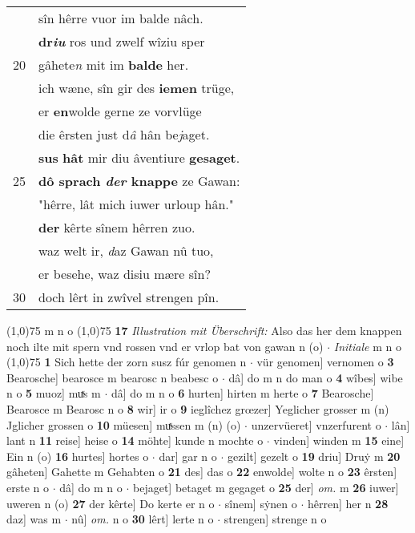 \documentclass[8pt,a4paper,notitlepage]{article}
\begin{document}
\begin{table}[ht]
\begin{minipage}[t]{0.5\linewidth}
\begin{tabular}{rl}
 & sîn hêrre vuor im balde nâch.\\ 
 & \textbf{dr\textit{iu}} ros und zwelf wîziu sper\\ 
20 & gâhete\textit{n} mit im \textbf{balde} her.\\ 
 & ich wæne, sîn gir des \textbf{iemen} trüge,\\ 
 & er \textbf{en}wolde gerne ze vorvlüge\\ 
 & die êrsten just d\textit{â} hân be\textit{j}aget.\\ 
 & \textbf{sus} \textbf{hât} mir diu âventiure \textbf{gesaget}.\\ 
25 & \textbf{dô sprach \textit{der} knappe} ze Gawan:\\ 
 & "hêrre, lât mich iuwer urloup hân."\\ 
 & \textbf{der} kêrte sînem hêrren zuo.\\ 
 & waz welt ir, \textit{d}az Gawan nû tuo,\\ 
 & er besehe, waz disiu mære sîn?\\ 
30 & doch lêrt in zwîvel strengen pîn.\\ 
\end{tabular}
\scriptsize
\line(1,0){75} \newline
m n o \newline
\line(1,0){75} \newline
\textbf{17} \textit{Illustration mit Überschrift:} Also das her dem knappen noch ilte mit spern vnd rossen vnd er vrlop bat von gawan n (o)   $\cdot$ \textit{Initiale} m n o  \newline
\line(1,0){75} \newline
\textbf{1} Sich hette der zorn susz fúr genomen n  $\cdot$ vür genomen] vernomen o \textbf{3} Bearosche] bearosce m bearosc n beabesc o  $\cdot$ dâ] do m n do man o \textbf{4} wîbes] wibe n o \textbf{5} muoz] muͯs m  $\cdot$ dâ] do m n o \textbf{6} hurten] hirten m herte o \textbf{7} Bearosche] Bearosce m Bearosc n o \textbf{8} wir] ir o \textbf{9} ieglîchez grœzer] Yeglicher grosser m (n) Jglicher grossen o \textbf{10} müesen] muͯssen m (n) (o)  $\cdot$ unzervüeret] vnzerfurent o  $\cdot$ lân] lant n \textbf{11} reise] heise o \textbf{14} möhte] kunde n mochte o  $\cdot$ vinden] winden m \textbf{15} eine] Ein n (o) \textbf{16} hurtes] hortes o  $\cdot$ dar] gar n o  $\cdot$ gezilt] gezelt o \textbf{19} driu] Druẏ m \textbf{20} gâheten] Gahette m Gehabten o \textbf{21} des] das o \textbf{22} enwolde] wolte n o \textbf{23} êrsten] erste n o  $\cdot$ dâ] do m n o  $\cdot$ bejaget] betaget m gegaget o \textbf{25} der] \textit{om.} m \textbf{26} iuwer] uweren n (o) \textbf{27} der kêrte] Do kerte er n o  $\cdot$ sînem] sẏnen o  $\cdot$ hêrren] her n \textbf{28} daz] was m  $\cdot$ nû] \textit{om.} n o \textbf{30} lêrt] lerte n o  $\cdot$ strengen] strenge n o \newline
\end{minipage}
\end{table}
\end{document}
